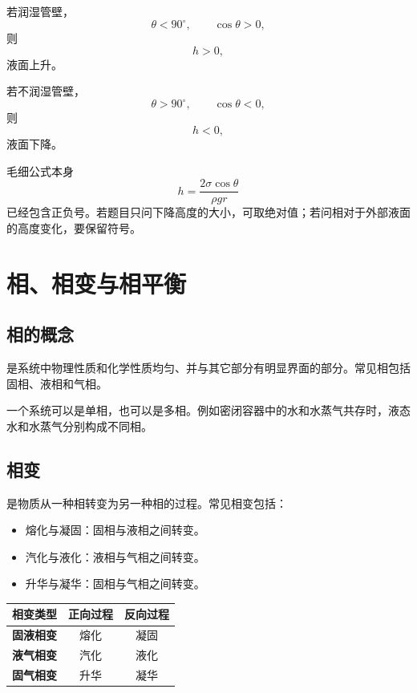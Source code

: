若润湿管壁，
\[
  \theta<90^\circ,\qquad \cos\theta>0,
\]
则
\[
  h>0,
\]
液面上升。

若不润湿管壁，
\[
  \theta>90^\circ,\qquad \cos\theta<0,
\]
则
\[
  h<0,
\]
液面下降。

\begin{WarnBox}[毛细公式的符号]
毛细公式本身
\[
  h=\frac{2\sigma\cos\theta}{\rho gr}
\]
已经包含正负号。若题目只问下降高度的大小，可取绝对值；若问相对于外部液面的高度变化，要保留符号。
\end{WarnBox}

\section{相、相变与相平衡}

\subsection{相的概念}

是系统中物理性质和化学性质均匀、并与其它部分有明显界面的部分。常见相包括固相、液相和气相。

一个系统可以是单相，也可以是多相。例如密闭容器中的水和水蒸气共存时，液态水和水蒸气分别构成不同相。

\subsection{相变}

是物质从一种相转变为另一种相的过程。常见相变包括：
\begin{itemize}
  \item 熔化与凝固：固相与液相之间转变。
  \item 汽化与液化：液相与气相之间转变。
  \item 升华与凝华：固相与气相之间转变。
\end{itemize}

\begin{FormulaBox}[常见相变]
\begin{tabularx}{\textwidth}{@{}>{\bfseries}lCC@{}}
\toprule
相变类型 & 正向过程 & 反向过程\\
\midrule
固液相变 & 熔化 & 凝固\\
液气相变 & 汽化 & 液化\\
固气相变 & 升华 & 凝华\\
\bottomrule
\end{tabularx}
\end{FormulaBox}

